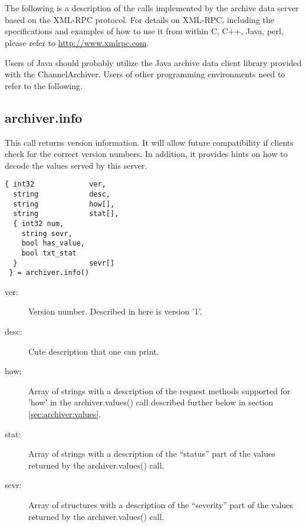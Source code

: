 \section{} \label{sec:xmlprotocol}
The following is a description of the calls implemented by the archive
data server based on the XML-RPC protocol.
For details on XML-RPC,  including the specifications and examples of
how to use it from within C,  C++, Java, perl, please refer to
\href{http://www.xmlrpc.com}{http://www.xmlrpc.com}.

Users of Java should probably utilize the Java archive data client
library provided with the ChannelArchiver. Users of other programming
environments need to refer to the following.

\subsection{archiver.info} \label{sec:archiver:info} %
This call returns version information. It will allow future
compatibility if clients check for the correct version numbers.  In
addition, it provides hints on how to decode the values served by this
server.

\begin{lstlisting}[keywordstyle=\sffamily]
{ int32             ver,
  string            desc,
  string            how[],
  string            stat[],
  { int32 num,
    string sevr,
    bool has_value,
    bool txt_stat
  }                 sevr[]
 } = archiver.info()
\end{lstlisting}

\begin{description}
\item[\sffamily ver:]  Version number. Described in here is version '1'.
\item[\sffamily desc:] Cute description that one can print.
\item[\sffamily how:]  Array of strings with a description of the
                       request methods supported for 'how' in the
           		       archiver.values() call described further below in
                       section \ref{sec:archiver:values}.
\item[\sffamily stat:] Array of strings with a description of the
                       ``status'' part of the values returned by
                       the archiver.values() call.     
\item[\sffamily sevr:] Array of structures with a description of the
                       ``severity'' part of the values returned by
                       the archiver.values() call.     
\end{description}

